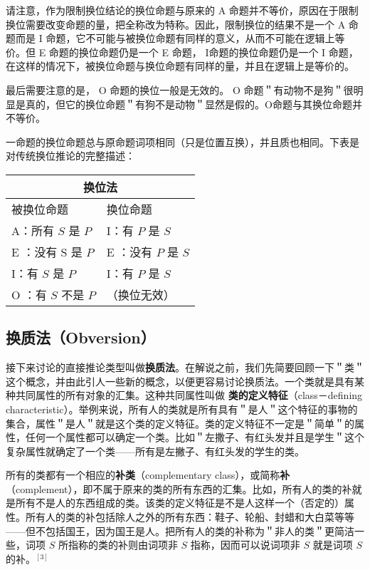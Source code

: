 请注意，作为限制换位结论的换位命题与原来的 A 命题并不等价，原因在于限制换位需要改变命题的量，把全称改为特称。因此，限制换位的结果不是一个 A 命题而是 I 命题，它不可能与被换位命题有同样的意义，从而不可能在逻辑上等价。但 E 命题的换位命题仍是一个 E 命题， I命题的换位命题仍是一个 I 命题，在这样的情况下，被换位命题与换位命题有同样的量，并且在逻辑上是等价的。

最后需要注意的是， O 命题的换位一般是无效的。 O 命题＂有动物不是狗＂很明显是真的，但它的换位命题＂有狗不是动物＂显然是假的。O命题与其换位命题并不等价。

一命题的换位命题总与原命题词项相同（只是位置互换），并且质也相同。下表是对传统换位推论的完整描述：

\begin{center}
\begin{tabular}{|l|l|}
\hline
\multicolumn{2}{|c|}{换位法} \\
\hline
被换位命题 & 换位命题 \\
\hline
A：所有 $S$ 是 $P$ & I：有 $P$ 是 $S$ \\
\hline
E ：没有 S 是 $P$ & E ：没有 $P$ 是 $S$ \\
\hline
I：有 $S$ 是 $P$ & I：有 $P$ 是 $S$ \\
\hline
O ：有 $S$ 不是 $P$ & （换位无效） \\
\hline
\end{tabular}
\end{center}

\subsection{换质法（Obversion）}
接下来讨论的直接推论类型叫做\textbf{换质法}。在解说之前，我们先简要回顾一下＂类＂这个概念，并由此引人一些新的概念，以便更容易讨论换质法。一个类就是具有某种共同属性的所有对象的汇集。这种共同属性叫做 \textbf{类的定义特征}（class－defining characteristic）。举例来说，所有人的类就是所有具有＂是人＂这个特征的事物的集合，属性＂是人＂就是这个类的定义特征。类的定义特征不一定是＂简单＂的属性，任何一个属性都可以确定一个类。比如＂左撒子、有红头发并且是学生＂这个复杂属性就确定了一个类——所有是左撇子、有红头发的学生的类。

所有的类都有一个相应的\textbf{补类}（complementary class），或简称\textbf{补}（complement），即不属于原来的类的所有东西的汇集。比如，所有人的类的补就是所有不是人的东西组成的类。该类的定义特征是不是人这样一个（否定的）属性。所有人的类的补包括除人之外的所有东西：鞋子、轮船、封蜡和大白菜等等——但不包括国王，因为国王是人。把所有人的类的补称为＂非人的类＂更简洁一些，词项 $S$ 所指称的类的补则由词项非 $S$ 指称，因而可以说词项非 $S$ 就是词项 $S$ 的补。$^{[3]}$

